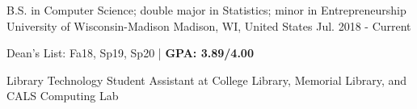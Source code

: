 

\begin{cventries}

  \cventry
  {B.S. in Computer Science; double major in Statistics; minor in Entrepreneurship} %
  {University of Wisconsin-Madison} %
  {Madison, WI, United States} %
  {Jul. 2018 - Current} %
  {
    \begin{cvitems} %
      \item {Dean's List: Fa18, Sp19, Sp20 | \textbf{GPA: 3.89/4.00}}
      \item {Library Technology Student Assistant at College Library, Memorial Library, and CALS Computing Lab}
    \end{cvitems}
  }

\end{cventries}
